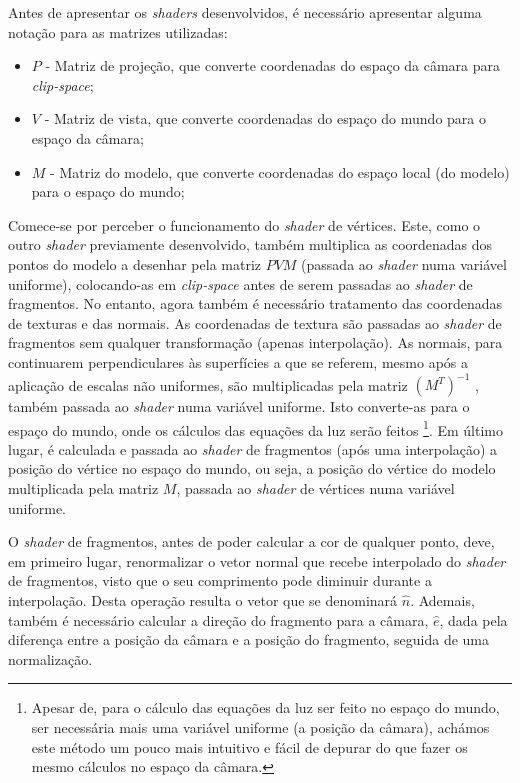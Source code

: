 \documentclass[12pt, a4paper]{article}
\begin{document}
Antes de apresentar os \emph{shaders} desenvolvidos, é necessário apresentar alguma notação para as
matrizes utilizadas:

\begin{itemize}
    \item $P$ - Matriz de projeção, que converte coordenadas do espaço da câmara para
        \emph{clip-space};
    \item $V$ - Matriz de vista, que converte coordenadas do espaço do mundo para o espaço da
        câmara;
    \item $M$ - Matriz do modelo, que converte coordenadas do espaço local (do modelo) para o espaço
        do mundo;
\end{itemize}

Comece-se por perceber o funcionamento do \emph{shader} de vértices. Este, como o outro
\emph{shader} previamente desenvolvido, também multiplica as coordenadas dos pontos do modelo a
desenhar pela matriz $PVM$ (passada ao \emph{shader} numa variável uniforme), colocando-as em
\emph{clip-space} antes de serem passadas ao \emph{shader} de fragmentos. No entanto, agora também é
necessário tratamento das coordenadas de texturas e das normais. As coordenadas de textura são
passadas ao \emph{shader} de fragmentos sem qualquer transformação (apenas interpolação). As
normais, para continuarem perpendiculares às superfícies a que se referem, mesmo após a aplicação de
escalas não uniformes, são multiplicadas pela matriz $(M^T)^{-1}$ \cite{learn-opengl-1}, também
passada ao \emph{shader} numa variável uniforme. Isto converte-as para o espaço do mundo, onde os
cálculos das equações da luz serão feitos
\footnote{Apesar de, para o cálculo das equações da
luz ser feito no espaço do mundo, ser necessária mais uma variável uniforme (a posição da câmara),
achámos este método um pouco mais intuitivo e fácil de depurar do que fazer os mesmo cálculos no
espaço da câmara.}.
Em último lugar, é calculada e passada ao \emph{shader} de fragmentos (após uma interpolação) a
posição do vértice no espaço do mundo, ou seja, a posição do vértice do modelo multiplicada pela
matriz $M$, passada ao \emph{shader} de vértices numa variável uniforme.

O \emph{shader} de fragmentos, antes de poder calcular a cor de qualquer ponto, deve, em primeiro
lugar, renormalizar o vetor normal que recebe interpolado do \emph{shader} de fragmentos, visto que
o seu comprimento pode diminuir durante a interpolação. Desta operação resulta o vetor que se
denominará $\hat{n}$. Ademais, também é necessário calcular a direção do fragmento para a câmara,
$\hat{e}$, dada pela diferença entre a posição da câmara e a posição do fragmento, seguida de uma
normalização.
\end{document}
